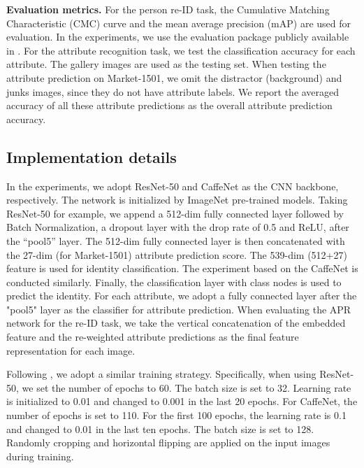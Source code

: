 \documentclass[5p,times,twocolumn]{elsarticle}
\begin{document}
    
\textbf{Evaluation metrics.} For the person re-ID task, the Cumulative Matching Characteristic (CMC) curve and the mean average precision (mAP) are used for evaluation. In the experiments, we use the evaluation package publicly available in \cite{Zheng_2015_ICCV,Zheng_2017_ICCV}. 
For the attribute recognition task, we test the classification accuracy for each attribute. The gallery images are used as the testing set. When testing the attribute prediction on Market-1501, we omit the distractor (background) and junks images, since they do not have attribute labels. We report the averaged accuracy of all these attribute predictions as the overall attribute prediction accuracy. 
    
\subsection{Implementation details}
In the experiments, we adopt ResNet-50 \cite{he2016deep} and CaffeNet \cite{jia2014caffe} as the CNN backbone, respectively. The network is initialized by ImageNet \cite{russakovsky2015imagenet} pre-trained models. Taking ResNet-50 for example, we append a 512-dim fully connected layer followed by Batch Normalization, a dropout layer with the drop rate of 0.5 and ReLU, after the “pool5” layer. The 512-dim fully connected layer is then concatenated with the 27-dim (for Market-1501) attribute prediction score.  The 539-dim (512+27) feature is used for identity classification. The experiment based on the CaffeNet is conducted similarly.
Finally, the classification layer with  class nodes is used to predict the identity.
For each attribute, we adopt a fully connected layer after the "pool5" layer as the classifier for attribute prediction.
When evaluating the APR network for the re-ID task, we take the vertical concatenation of the embedded feature and the re-weighted attribute predictions as the final feature representation for each image.


Following \cite{zheng2017discriminatively}, we adopt a similar training strategy. Specifically, when using ResNet-50, we set the number of epochs to 60. The batch size is set to 32. Learning rate is initialized to 0.01 and changed to 0.001 in the last 20 epochs. 
For CaffeNet, the number of epochs is set to 110. For the first 100 epochs, the learning rate is 0.1 and changed to 0.01 in the last ten epochs. The batch size is set to 128. Randomly cropping and horizontal flipping are applied on the input images during training.
    
\end{document}
